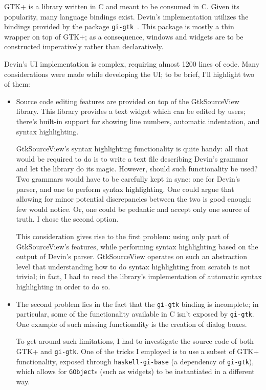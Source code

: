 \documentclass[UdineBachThesis,american,11pt]{PhdThesis}
\begin{document}
  GTK+ is a library written in C and meant to be consumed in C. Given its
  popularity, many language bindings exist. Devin's implementation utilizes the
  bindings provided by the package \mbox{\texttt{gi-gtk}}~\cite{gi-gtk}. This
  package is mostly a thin wrapper on top of GTK+; as a consequence, windows and
  widgets are to be constructed imperatively rather than declaratively.

  Devin's UI implementation is complex, requiring almost 1200 lines of code.
  Many considerations were made while developing the UI; to be brief, I'll
  highlight two of them:

  \begin{itemize}
    \item Source code editing features are provided on top of the GtkSourceView
    library. This library provides a text widget which can be edited by users;
    there's built-in support for showing line numbers, automatic indentation,
    and syntax highlighting.

    \pagebreak

    GtkSourceView's syntax highlighting functionality is quite handy: all that
    would be required to do is to write a text file describing Devin's grammar
    and let the library do its magic. However, should such functionality be
    used? Two grammars would have to be carefully kept in sync: one for Devin's
    parser, and one to perform syntax highlighting. One could argue that
    allowing for minor potential discrepancies between the two is good enough:
    few would notice. Or, one could be pedantic and accept only one source of
    truth. I chose the second option.

    This consideration gives rise to the first problem: using only part of
    GtkSourceView's features, while performing syntax highlighting based on the
    output of Devin's parser. GtkSourceView operates on such an abstraction
    level that understanding how to do syntax highlighting from scratch is not
    trivial; in fact, I had to read the library's implementation of automatic
    syntax highlighting in order to do so.

    \item The second problem lies in the fact that the \mbox{\texttt{gi-gtk}}
    binding is incomplete; in particular, some of the functionality available in
    C isn't exposed by \mbox{\texttt{gi-gtk}}. One example of such missing
    functionality is the creation of dialog boxes.

    To get around such limitations, I had to investigate the source code of both
    GTK+ and \mbox{\texttt{gi-gtk}}. One of the tricks I employed is to use a
    subset of GTK+ functionality, exposed through
    \mbox{\texttt{haskell-gi-base}} (a dependency of \mbox{\texttt{gi-gtk}}),
    which allows for \mbox{\texttt{GObject}s} (such as widgets) to be
    instantiated in a different way.
  \end{itemize}
\end{document}
